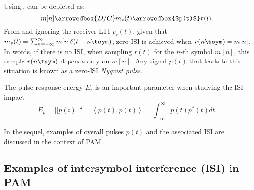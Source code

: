 Using ,  can be depicted as:
\begin{equation}
m[n] \arrowedbox{ D/C } m_s(t) \arrowedbox{$p(t)$} r(t).
\label{eq:isiModelRepeated}
\end{equation}
From  and ignoring the receiver LTI $p_r(t)$, given that $m_s(t) = \sum_{n=-\infty}^{\infty} m[n] \delta(t-n \tsym)$, zero ISI is achieved when $r(n \tsym) = m[n]$. In words,
if there is no ISI, when sampling $r(t)$ for the $n$-th symbol $m[n]$, this sample $r(n \tsym)$ depends only on $m[n]$. Any signal $p(t)$ that leads to this situation is known as a zero-ISI \emph{Nyquist pulse}.

The pulse response energy $E_p$ is an important parameter when studying the ISI impact
\begin{equation}
E_p = ||p(t)||^2 = \left< p(t),p(t) \right> = \int_{-\infty}^{\infty} p(t)p^*(t) dt.
\label{eq:}
\end{equation}

In the sequel, examples of overall pulses $p(t)$ and the associated ISI
are discussed in the context of PAM.


\subsection{Examples of intersymbol interference (ISI) in PAM}


%

